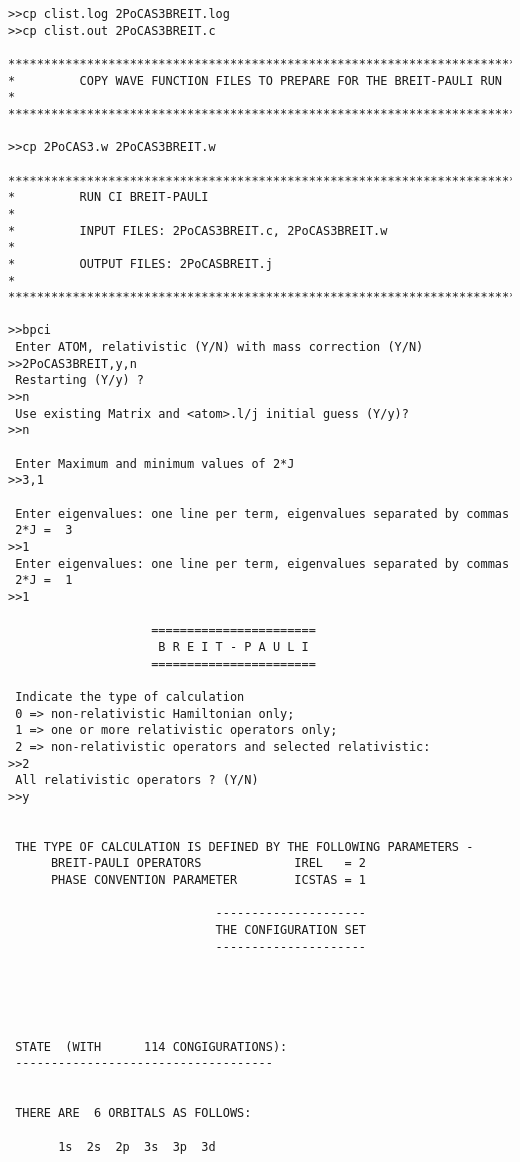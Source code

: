 \documentclass[fleqn,10pt]{book}
\begin{document}
\begin{verbatim}
>>cp clist.log 2PoCAS3BREIT.log
>>cp clist.out 2PoCAS3BREIT.c

*******************************************************************************
*         COPY WAVE FUNCTION FILES TO PREPARE FOR THE BREIT-PAULI RUN         *
*******************************************************************************

>>cp 2PoCAS3.w 2PoCAS3BREIT.w

*******************************************************************************
*         RUN CI BREIT-PAULI                                                  *
*         INPUT FILES: 2PoCAS3BREIT.c, 2PoCAS3BREIT.w                         *
*         OUTPUT FILES: 2PoCASBREIT.j                                         *
*******************************************************************************

>>bpci
 Enter ATOM, relativistic (Y/N) with mass correction (Y/N)
>>2PoCAS3BREIT,y,n
 Restarting (Y/y) ?
>>n
 Use existing Matrix and <atom>.l/j initial guess (Y/y)?
>>n

 Enter Maximum and minimum values of 2*J
>>3,1

 Enter eigenvalues: one line per term, eigenvalues separated by commas
 2*J =  3
>>1
 Enter eigenvalues: one line per term, eigenvalues separated by commas
 2*J =  1
>>1

                    =======================
                     B R E I T - P A U L I
                    =======================

 Indicate the type of calculation
 0 => non-relativistic Hamiltonian only;
 1 => one or more relativistic operators only;
 2 => non-relativistic operators and selected relativistic:
>>2
 All relativistic operators ? (Y/N)
>>y


 THE TYPE OF CALCULATION IS DEFINED BY THE FOLLOWING PARAMETERS -
      BREIT-PAULI OPERATORS             IREL   = 2
      PHASE CONVENTION PARAMETER        ICSTAS = 1

                             ---------------------
                             THE CONFIGURATION SET
                             ---------------------





 STATE  (WITH      114 CONGIGURATIONS):
 ------------------------------------


 THERE ARE  6 ORBITALS AS FOLLOWS:

       1s  2s  2p  3s  3p  3d


\end{verbatim}
\end{document}
